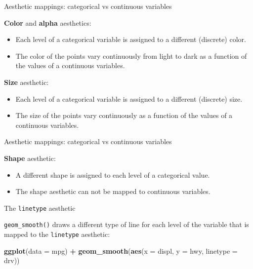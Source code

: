 \documentclass[ignorenonframetext,]{beamer}
\newenvironment{Shaded}{\begin{snugshade}}{\end{snugshade}}
\newcommand{\DataTypeTok}[1]{\textcolor[rgb]{0.13,0.29,0.53}{#1}}
\newcommand{\KeywordTok}[1]{\textcolor[rgb]{0.13,0.29,0.53}{\textbf{#1}}}
\newcommand{\NormalTok}[1]{#1}
\newcommand{\OperatorTok}[1]{\textcolor[rgb]{0.81,0.36,0.00}{\textbf{#1}}}
\newcommand{\StringTok}[1]{\textcolor[rgb]{0.31,0.60,0.02}{#1}}
\begin{document}
\begin{frame}{Aesthetic mappings: categorical vs continuous variables}
\protect\hypertarget{aesthetic-mappings-categorical-vs-continuous-variables}{}

\textbf{Color} and \textbf{alpha} aesthetics:

\begin{itemize}
\item
  Each level of a categorical variable is assigned to a different
  (discrete) color.
\item
  The color of the points vary continuously from light to dark as a
  function of the values of a continuous variables.
\end{itemize}

\textbf{Size} aesthetic:

\begin{itemize}
\item
  Each level of a categorical variable is assigned to a different
  (discrete) size.
\item
  The size of the points vary continuously as a function of the values
  of a continuous variables.
\end{itemize}

\end{frame}

\begin{frame}{Aesthetic mappings: categorical vs continuous variables}
\protect\hypertarget{aesthetic-mappings-categorical-vs-continuous-variables-1}{}

\textbf{Shape} aesthetic:

\begin{itemize}
\item
  A different shape is assigned to each level of a categorical value.
\item
  The shape aesthetic can not be mapped to continuous variables.
\end{itemize}

\end{frame}

\begin{frame}[fragile]{The \texttt{linetype} aesthetic}
\protect\hypertarget{the-linetype-aesthetic}{}

\texttt{geom\_smooth()} draws a different type of line for each level of
the variable that is mapped to the \texttt{linetype} aesthetic:

\begin{Shaded}
\begin{Highlighting}[]
\KeywordTok{ggplot}\NormalTok{(}\DataTypeTok{data =}\NormalTok{ mpg) }\OperatorTok{+}\StringTok{ }
\StringTok{  }\KeywordTok{geom_smooth}\NormalTok{(}\KeywordTok{aes}\NormalTok{(}\DataTypeTok{x =}\NormalTok{ displ, }\DataTypeTok{y =}\NormalTok{ hwy, }\DataTypeTok{linetype =}\NormalTok{ drv))}
\end{Highlighting}
\end{Shaded}

\end{frame}
\end{document}
